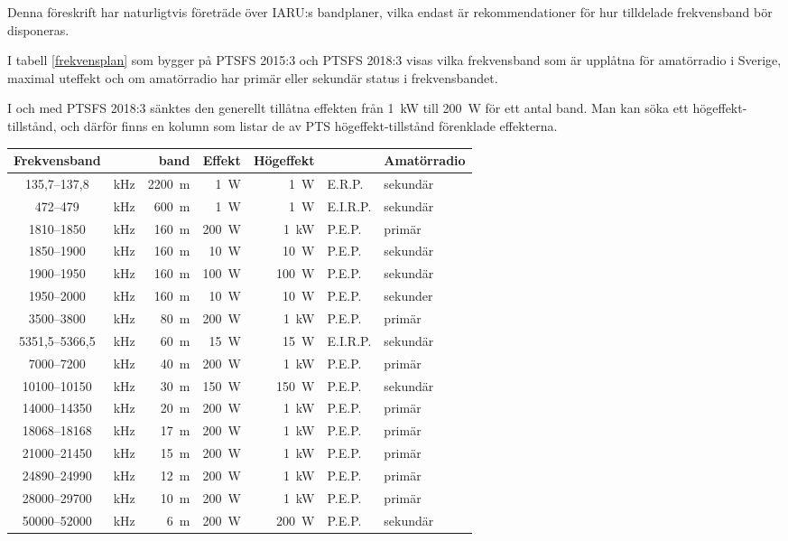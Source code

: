 Denna föreskrift har naturligtvis företräde över IARU:s bandplaner, vilka
endast är rekommendationer för hur tilldelade frekvensband bör disponeras.

I tabell \ref{frekvensplan} som bygger på PTSFS 2015:3 och PTSFS 2018:3 visas
vilka frekvensband som är upplåtna för amatörradio i Sverige, maximal uteffekt
och om amatörradio har primär eller sekundär status i frekvensbandet.

I och med PTSFS 2018:3 sänktes den generellt tillåtna effekten från 1~kW till
200~W för ett antal band. Man kan söka ett högeffekt-tillstånd, och därför
finns en kolumn som listar de av PTS högeffekt-tillstånd förenklade effekterna.

\begin{table*}[b!]
  \centering
\caption{Frekvensband för amatörradio i Sverige}
\label{frekvensplan}
\begin{tabular}{clr|rrl|l}
Frekvensband &  & band & Effekt & Högeffekt & & Amatörradio\\ \hline
135,7--137,8 & kHz & 2200~m & 1~W & 1~W & E.R.P. & sekundär\\
472--479 & kHz & 600~m & 1~W & 1~W & E.I.R.P. & sekundär\\
1810--1850 & kHz & 160~m & 200~W & 1~kW & P.E.P. & primär\\
1850--1900 & kHz & 160~m & 10~W & 10~W & P.E.P. & sekundär\\
1900--1950 & kHz & 160~m & 100~W & 100~W & P.E.P. & sekundär\\
1950--2000 & kHz & 160~m & 10~W & 10~W & P.E.P. & sekunder\\
3500--3800 & kHz & 80~m  & 200~W & 1~kW & P.E.P. & primär\\
5351,5--5366,5 & kHz & 60~m & 15~W & 15~W & E.I.R.P. & sekundär\\
7000--7200 & kHz & 40~m  & 200~W & 1~kW & P.E.P. & primär\\
10100--10150 & kHz & 30~m & 150~W & 150~W & P.E.P. & sekundär\\
14000--14350 & kHz & 20~m & 200~W & 1~kW & P.E.P. & primär\\
18068--18168 & kHz & 17~m & 200~W & 1~kW & P.E.P. & primär\\
21000--21450 & kHz & 15~m & 200~W & 1~kW & P.E.P. & primär\\
24890--24990 & kHz & 12~m & 200~W & 1~kW & P.E.P. & primär\\
28000--29700 & kHz & 10~m & 200~W & 1~kW & P.E.P. & primär\\
50000--52000 & kHz & 6~m & 200~W & 200~W & P.E.P. & sekundär\\ \hline

\end{tabular}
\end{table*}
